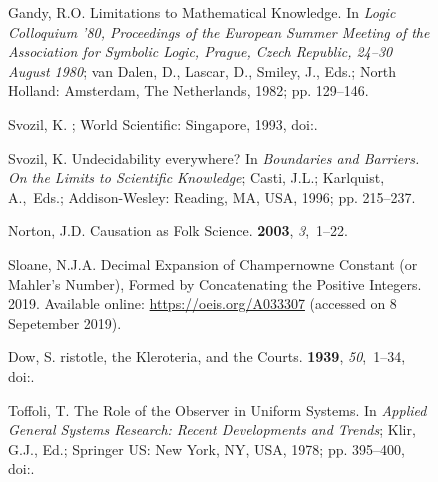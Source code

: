 \documentclass[entropy,article,accept,oneauthor,pdftex]{Definitions/mdpi}
\begin{document}
\begin{figure}[H]
\begin{thebibliography}{999}
Gandy, R.O.
\newblock Limitations to Mathematical Knowledge. In {\em Logic Colloquium '80, Proceedings of the {E}uropean Summer Meeting of the Association for Symbolic Logic, Prague, Czech Republic, 24--30 August 1980}; van Dalen, D., Lascar, D., Smiley, J., Eds.; North Holland: Amsterdam, The Netherlands, 1982; pp. 129--146.

Svozil, K.
; World Scientific: Singapore, 1993, doi:{\href{https://doi.org/10.1142/1524}{}}.

Svozil, K.
\newblock Undecidability everywhere? In {\em Boundaries and Barriers. On the
  Limits to Scientific Knowledge}; Casti, J.L.; Karlquist, A.,~Eds.;
  Addison-Wesley: Reading, MA, USA, 1996; pp. 215--237.


Norton, J.D.
\newblock Causation as Folk Science.
 {\bf 2003}, {\em 3},~1--22.

Sloane, N.J.A.
 {D}ecimal Expansion of {C}hampernowne Constant (or
  {M}ahler's Number), Formed by Concatenating the Positive Integers. 2019. Available online: \url{https://oeis.org/A033307} (accessed on 8 Sepetember 2019).

Dow, S.
ristotle, the {K}leroteria, and the Courts.
 {\bf 1939}, {\em 50},~1--34, doi:{\href{https://doi.org/10.2307/310590}{}}.

Toffoli, T.
\newblock The Role of the Observer in Uniform Systems. In {\em Applied General
  Systems Research: Recent Developments and Trends}; Klir, G.J., Ed.; Springer US: New York, NY, USA, 1978; pp. 395--400, doi:{\href{https://doi.org/10.1007/978-1-4757-0555-3\_29}{}}.


\end{thebibliography}
\end{figure}
\end{document}
